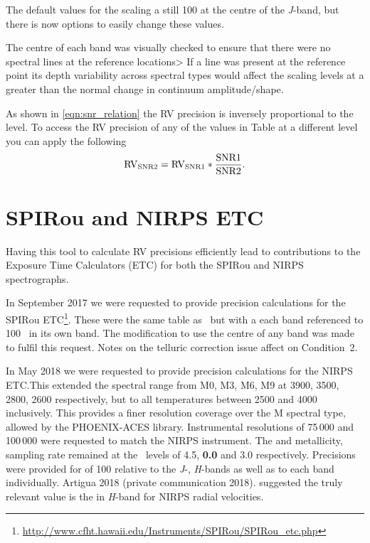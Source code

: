 The default values for the \snr{} scaling a still 100 at the centre of the \textit{J}-band, but there is now options to easily change these values.

The centre of each band was visually checked to ensure that there were no spectral lines at the reference locations> If a line was present at the reference point its depth variability across spectral types would affect the \snr{} scaling levels at a greater than the normal change in continuum amplitude/shape.

As shown in \cref{eqn:snr_relation} the {RV} precision is inversely proportional to the \snr{} level.
To access the {RV} precision of any of the values in Table at a different \snr{} level you can apply the following
\begin{equation}
\rm {RV}_{\textrm{SNR}{}2} = {RV}_{\textrm{SNR}{}1} * \frac{\textrm{SNR}{}1}{\textrm{SNR}{}2}.
\end{equation}

\section{{SPIRou} and {NIRPS} {ETC}}\label{sec:spirou_nirps_etc}
Having this tool to calculate {RV} precisions efficiently lead to contributions to the Exposure Time Calculators (ETC) for both the {SPIRou} and {NIRPS} spectrographs.

In September 2017 we were requested to provide precision calculations for the {SPIRou} ETC\footnote{\url{http://www.cfht.hawaii.edu/Instruments/SPIRou/SPIRou_etc.php}}.
These were the same table as~\citet{figueira_radial_2016} but with a each band referenced to 100~{\snr{}} in its own band.
The modification to use the centre of any band was made to fulfil this request.
Notes on the telluric correction issue affect on Condition~2.

In May 2018 we were requested to provide precision calculations for the {NIRPS} {ETC}.\@ This extended the spectral range from {M0}, {M3}, {M6}, {M9} at 3900, 3500, 2800, 2600\K{} respectively, but to all temperatures between 2500 and 4000\K{} inclusively.
This provides a finer resolution coverage over the M spectral type, allowed by the {PHOENIX-ACES} library.
Instrumental resolutions of 75\,000 and 100\,000 were requested to match the {NIRPS} instrument.
The \logg{} and metallicity, sampling rate remained at the~\citet{figueira_radial_2016} levels of 4.5, \textbf{0.0} and 3.0 respectively.\todo{}
Precisions were provided for \snr{} of 100 relative to the \emph{J}-, \emph{H}-bands as well as to each band individually.
Artigua 2018 (private communication 2018).  suggested the truly relevant value is the \snr{} in \emph{H}-band for {NIRPS} radial velocities.

